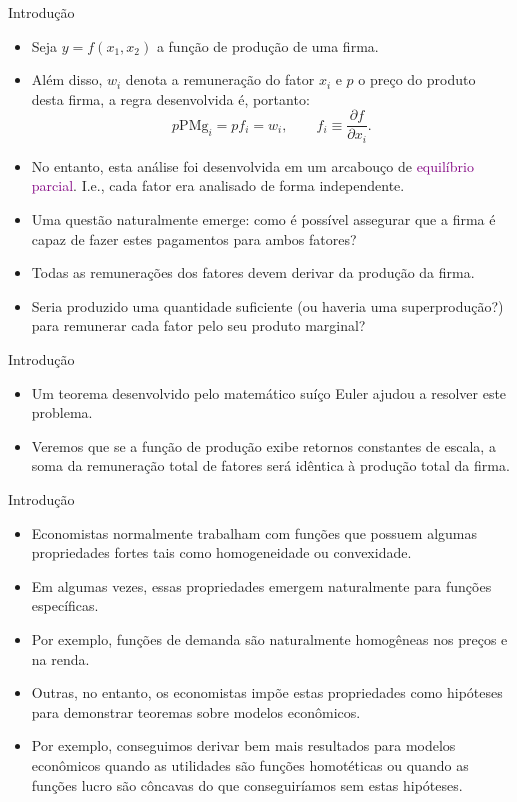 \documentclass[10pt]{beamer}
\begin{document}
\begin{frame}{Introdução}
    \begin{itemize}
        \item Seja $y = f(x_1, x_2)$ a função de produção de uma firma.
        \bigskip
        \item Além disso, $w_i$ denota a remuneração do fator $x_i$ e $p$ o preço do produto desta firma, a regra desenvolvida é, portanto:
        \[
            p \text{PMg}_i = pf_i = w_i, \qquad f_i \equiv \frac{\partial f}{\partial x_i}.    
        \]
         
        \item No entanto, esta análise foi desenvolvida em um arcabouço de \textcolor{purple}{equilíbrio parcial}. I.e., cada fator era analisado de forma independente.
        \bigskip
        \item Uma questão naturalmente emerge: como é possível assegurar que a firma é capaz de fazer estes pagamentos para ambos fatores?
        \bigskip
        \item Todas as remunerações dos fatores devem derivar da produção da firma.
        \bigskip
        \item Seria produzido uma quantidade suficiente (ou haveria uma superprodução?) para remunerar cada fator pelo seu produto marginal?
    \end{itemize}
\end{frame}

\begin{frame}{Introdução}
    \begin{itemize}
        \item Um teorema desenvolvido pelo matemático suíço Euler ajudou a resolver este problema.
        \bigskip
        \item Veremos que se a função de produção exibe retornos constantes de escala, a soma da remuneração total de fatores será idêntica à produção total da firma.
    \end{itemize}
\end{frame}

\begin{frame}{Introdução}
    \begin{itemize}
        \item Economistas normalmente trabalham com funções que possuem algumas propriedades fortes tais como homogeneidade ou convexidade.
        \bigskip
        \item Em algumas vezes, essas propriedades emergem naturalmente para funções específicas.
        \bigskip
        \item Por exemplo, funções de demanda são naturalmente homogêneas nos preços e na renda.
        \bigskip
        \item Outras, no entanto, os economistas impõe estas propriedades como hipóteses para demonstrar teoremas sobre modelos econômicos.
        \bigskip
        \item Por exemplo, conseguimos derivar bem mais resultados para modelos econômicos quando as utilidades são funções homotéticas ou quando as funções lucro são côncavas do que conseguiríamos sem estas hipóteses.
    \end{itemize}
\end{frame}
\end{document}
